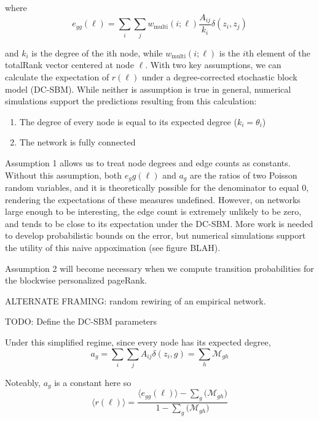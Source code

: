 \documentclass[12pt]{article}
\begin{document}
where 
\begin{equation}
  e_{gg}(\ell) = \sum_i \sum_j w_{\text{multi}}(i; \ell) \frac{A_{ij}}{k_i} \delta(z_i, z_j) 
\end{equation}

and $k_i$ is the degree of the ith node, while $w_{\text{multi}}(i; \ell)$ is the $i$th element of the totalRank vector centered at node $\ell$.  With two key assumptions, we can calculate the expectation of $r(\ell)$ under a degree-corrected stochastic block model (DC-SBM).  While neither is assumption is true in general, numerical simulations support the predictions resulting from this calculation:

\begin{enumerate}
  \item The degree of every node is equal to its expected degree ($k_i = \theta_i$)
  \item The network is fully connected
\end{enumerate}

Assumption 1 allows us to treat node degrees and edge counts as constants.  Without this assumption, both $e_gg(\ell)$ and $a_g$ are the ratios of two Poisson random variables, and it is theoretically possible for the denominator to equal 0, rendering the expectations of these measures undefined.  However, on networks large enough to be interesting, the edge count is extremely unlikely to be zero, and tends to be close to its expectation under the DC-SBM.  More work is needed to develop probabilistic bounds on the error, but numerical simulations support the utility of this naive appoximation (see figure BLAH).    

Assumption 2 will become necessary when we compute transition probabilities for the blockwise personalized pageRank. 

ALTERNATE FRAMING: random rewiring of an empirical network.

TODO: Define the DC-SBM parameters

Under this simplified regime, since every node has its expected degree,
\begin{equation}
  a_g = \sum_i \sum_j A_{ij} \delta(z_i, g) = \sum_h \mathcal{M}_{gh}
\end{equation}

Noteably, $a_g$ is a constant here so 
\begin{equation}
  \langle r(\ell) \rangle = \frac{\langle e_{gg}(\ell) \rangle - \sum_g \big( \mathcal{M}_{gh} \big)}{1 - \sum_g \big( \mathcal{M}_{gh} \big)}
\end{equation}
\end{document}

